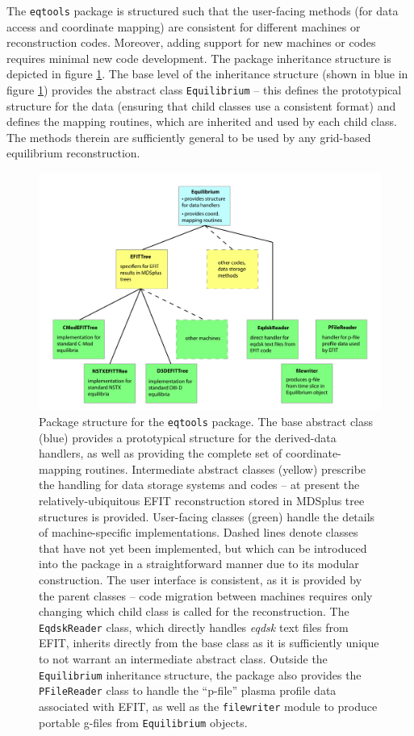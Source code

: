 \documentclass[12pt,floatfix,showpacs]{revtex4-1}
\newcommand{\eqtools}{\texttt{eqtools}\xspace}
\begin{document}
The \eqtools package is structured such that the user-facing methods (for data access and coordinate mapping) are consistent for different machines or reconstruction codes.
Moreover, adding support for new machines or codes requires minimal new code development.  
The package inheritance structure is depicted in figure \ref{fig:flowchart}.  
The base level of the inheritance structure (shown in blue in figure \ref{fig:flowchart}) provides the abstract class \verb|Equilibrium| -- this defines the prototypical structure for the data (ensuring that child classes use a consistent format) and defines the mapping routines, which are inherited and used by each child class.  
The methods therein are sufficiently general to be used by any grid-based equilibrium reconstruction.

\begin{figure}[p]
 \includegraphics[width=\textwidth]{graphics/flowchart.pdf}
 \caption{Package structure for the \eqtools package.  The base abstract class (blue) provides a prototypical structure for the derived-data handlers, as well as providing the complete set of coordinate-mapping routines.  Intermediate abstract classes (yellow) prescribe the handling for data storage systems and codes -- at present the relatively-ubiquitous EFIT reconstruction stored in MDSplus tree structures is provided.  User-facing classes (green) handle the details of machine-specific implementations.  Dashed lines denote classes that have not yet been implemented, but which can be introduced into the package in a straightforward manner due to its modular construction.  The user interface is consistent, as it is provided by the parent classes -- code migration between machines requires only changing which child class is called for the reconstruction.  The \texttt{EqdskReader} class, which directly handles \emph{eqdsk} text files from EFIT, inherits directly from the base class as it is sufficiently unique to not warrant an intermediate abstract class.  Outside the \texttt{Equilibrium} inheritance structure, the package also provides the \texttt{PFileReader} class to handle the ``p-file'' plasma profile data associated with EFIT, as well as the \texttt{filewriter} module to produce portable g-files from \texttt{Equilibrium} objects.}
 \label{fig:flowchart}
\end{figure}
\end{document}
